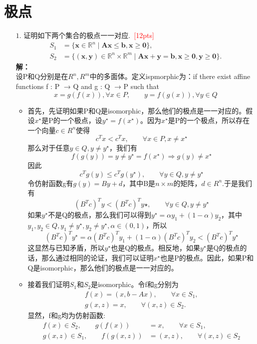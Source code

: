 \documentclass[10pt]{article}
\begin{document}
\section{极点}
\begin{itemize}
	\item[$1.$] 证明如下两个集合的极点一一对应.~\textcolor{red}{[12pts]}
	\begin{equation}\label{prob.Linf}
		\begin{aligned}
			S_1 &= \{\bm{x}\in\mathbb{R}^{n}\mid \bm{A}\bm{x}\leq\bm{b}, \bm{x}\geq\bm{0}\},\\
			S_2 &= \{(\bm{x},\bm{y})\in\mathbb{R}^{n}\times\mathbb{R}^{m}\mid \bm{A}\bm{x} + \bm{y} = \bm{b}, \bm{x}\geq\bm{0}, \bm{y}\geq\bm{0}\}.
		\end{aligned}
	\end{equation}
	\textbf{解：}\\
	设P和Q分别是在$R^n,R^m$中的多面体。定义ispmorphic为：if there exist affine functions f : P 􏰏→ Q and g : Q 􏰏→ P such that
	$$x=g(f(x)),\forall x \in P,\quad\quad y=f(g(x)),\forall y\in Q$$
	\begin{itemize}
	\item 首先，先证明如果P和Q是isomorphic，那么他们的极点是一一对应的。假设$x^\star$是P的一个极点，设$y^\star = f(x^\star)$。因为$x^\star$是P的一个极点，所以存在一个向量$c\in R^n$使得
	$$c^Tx<c^Tx,\quad\quad\forall x\in P,x\neq x^\star$$
	那么对于任意$y\in Q,y\neq y^\star$，我们有
	$$f(g(y))=y\neq y^\star =f(x^\star) \Rightarrow g(y)\neq x^\star$$
	因此
	$$c^Tg(y)\le c^Tg(y^\star),\qquad\forall y\in Q, y\neq y^\star$$
	令仿射函数g有$g(y)=By+d$，其中B是$n\times m$的矩阵，$d\in R^n$.于是我们有
	$$(B^Tc)^Ty<(B^Tc)^Ty\star,\qquad \forall y \in Q,y\neq y^\star$$
	如果$y^\star$不是Q的极点，那么我们可以得到$y^\star=\alpha y_1+(1-\alpha)y_2$，其中$y_1,y_2\in Q,y_1\neq y^\star,y_2\neq y^\star,\alpha\in(0,1)$，所以
	$$(B^Tc)^Ty^\star =\alpha(B^Tc)^Ty_1+(1-\alpha)(B^Tc)^Ty_2<(B^Tc)^Ty^\star$$
	这显然与已知矛盾，所以$y^\star$也是Q的极点。相反地，如果$y^\star$是Q的极点的话，那么通过相同的论证，我们可以证明$x^\star$也是P的极点。因此，如果P和Q是isomorphic，那么他们的极点是一一对应的。
	\item 接着我们证明$S_1$和$S_2$是isomorphic。令f和g分别为
	\begin{align*}
	f(x)=(x,b-Ax),\qquad\forall x\in S_1,\\
	g(x,z)=x,\qquad \forall(x,z)\in S_2.
	\end{align*}
	显然，f和g均为仿射函数:
	\begin{align*}
	f(x)\in S_2,\qquad g(f(x))&=x, \qquad\forall x\in S_1,\\
	g(x,z)\in S_1,\qquad f(g(x,z))&=(x,z), \qquad\forall (x,z)\in S_2
	\end{align*}
		

\end{itemize}
\end{itemize}
\end{document}
